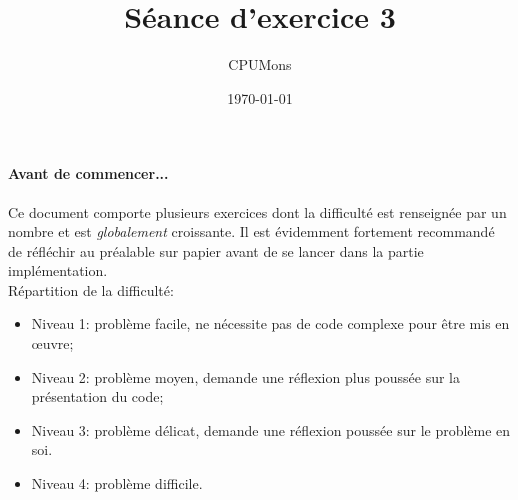 \documentclass[a4paper]{article}
\title{Séance d'exercice 3}
\author{CPUMons}
\date{\today}
\begin{document}
\maketitle

\paragraph{Avant de commencer...}
Ce document comporte plusieurs exercices dont la difficulté est renseignée par un nombre et est \emph{globalement} croissante. Il est évidemment fortement recommandé de réfléchir au préalable sur papier avant de se lancer dans la partie implémentation.\\
Répartition de la difficulté:
\begin{itemize}
\item Niveau 1: problème facile, ne nécessite pas de code complexe pour être mis en œuvre;
\item Niveau 2: problème moyen, demande une réflexion plus poussée sur la présentation du code;
\item Niveau 3: problème délicat, demande une réflexion poussée sur le problème en soi.
\item Niveau 4: problème difficile.
\end{itemize}
\begin{comment}
\section{Rappel (ou non): lire une entrée}

\subsection{En théorie:}
En Python3, la fonction \emph{input()} est utilisée pour lire une entrée via l'invite de commande.\\
\emph{Entrée:} Aucun argument n'est obligatoire, mais on peut aussi fournir une chaîne de caractère qui sera affichée afin que l'utilisateur sache ce qu'il doit entrer.\\
\emph{Sortie:} L'entrée fournie par l'utilisateur, sous forme de chaine de caractère (\emph{String}).\\
Il est donc important de convertir la donnée retournée!
\subsection{En pratique:}
Tâche: additionner deux nombres donnés en entrée et afficher le résultat.\\
\begin{verbatim}
nbr1 = input("Votre premier nombre : ")
nbr2 = input("Votre second nombre : ")
res = int(nbr1) + int(nbr2)
print(res)
\end{verbatim}
\end{comment}
\end{document}
